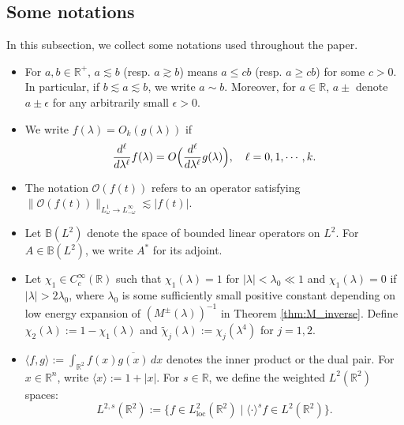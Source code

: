 \documentclass[reqno]{amsart}
\numberwithin{equation}{section}
\begin{document}
\subsection{Some notations}\label{Notations}
In this subsection, we collect some notations used throughout the paper.
	\begin{itemize}
		
		
\item For $a,b\in\mathbb{R}^+$, $a\lesssim b$ (resp. $a\gtrsim b$) means $a\le cb$ (resp. $a\ge cb$) for some $c>0$. In particular, if $b\lesssim a\lesssim b$, we write $a\sim b$. Moreover, for $a\in \mathbb{R}$,   $a\pm$ denote $a\pm \epsilon$   for any arbitrarily small  $\epsilon >0$.
        \vskip0.2cm
		\item We write $f(\lambda) = {O}_k(g(\lambda))$ if
    \[
        \frac{d^\ell}{d\lambda^\ell} f(\lambda) = O\Bigl( \frac{d^\ell}{d\lambda^\ell} g(\lambda) \Bigr), \quad \ell = 0, 1, \cdots,k.
    \]
   \vskip 0.2cm
   \item The notation $\mathcal{O}(f(t))$ refers to an operator satisfying $\|\mathcal{O}(f(t))\|_{L^1_\omega \rightarrow L^{\infty}_{-\omega}} \lesssim |f(t)|.$
   \vskip 0.2cm
   \item  Let \(\mathbb{B}(L^2)\) denote the space of bounded linear operators on \(L^2\). For \(A\in\mathbb{B}(L^2)\), we write \(A^*\) for its adjoint.
        \vskip0.2cm
		
		\item Let $\chi_1 \in C_c^{\infty}(\mathbb{R})$ such that $\chi_1(\lambda)=1$ for $|\lambda|<\lambda_0\ll1$ and $\chi_1(\lambda)=0$ if $|\lambda|>2\lambda_0$, where $\lambda_0$ is some sufficiently small positive constant depending on low energy expansion of $\left( M^{\pm}(\lambda)\right)^{-1}$ in Theorem \ref{thm:M_inverse}. Define $\chi_2(\lambda):=1-\chi_1(\lambda)$ and $\widetilde{\chi}_j(\lambda):=\chi_j(\lambda^4)$  for  $j=1,2.$
\vskip0.2cm
\item
    $ \langle f, g \rangle := \int_{\mathbb{R}^2} f(x) \overline{g(x)} \, dx$ denotes the inner product  or the dual pair.
	For $x\in\mathbb{R}^n$, write $\langle x \rangle := 1 + | x |$.
		For $s \in \mathbb{R}$, we  define the weighted $L^2(\mathbb{R}^2) $ spaces:
		$$L^{2,s}(\mathbb{R}^2) := \{ f \in L_{\text {loc}}^2(\mathbb{R}^2) \mid  \langle \cdot \rangle^s f \in L^2(\mathbb{R}^2) \} .$$
\end{itemize}
\end{document}
